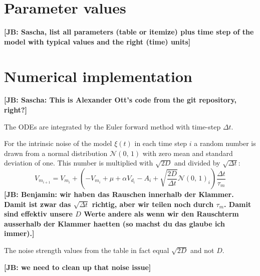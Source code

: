 \documentclass[12pt,a4paper]{article}
\newcommand{\note}[2][]{\textbf{[#1: #2]}}
\begin{document}
\section{Parameter values}

\note[JB]{Sascha, list all parameters (table or itemize) plus time step of the model with typical values and the right (time) units}


\section{Numerical implementation}

\note[JB]{Sascha: This is Alexander Ott's code from the git repository, right?}

The ODEs are integrated by the Euler forward method with time-step $\Delta t$.

For the intrinsic noise of the model $\xi(t)$ in each time step $i$ a random number is drawn from a normal distribution $\mathcal{N}(0,\,1)$ with zero mean and standard deviation of one. This number is multiplied with $\sqrt{2D}$ and divided by $\sqrt{\Delta t}$:
\begin{equation}
  \label{LIFintegration}
  V_{m_{i+1}}  = V_{m_i} + \left(-V_{m_i} + \mu + \alpha V_{d_i} - A_i + \sqrt{\frac{2D}{\Delta t}}\mathcal{N}(0,\,1)_i\right) \frac{\Delta t}{\tau_m}
\end{equation}
\note[JB]{Benjamin: wir haben das Rauschen innerhalb der Klammer. Damit ist zwar das $\sqrt{\Delta t}$ richtig, aber wir teilen noch durch $\tau_m$. Damit sind effektiv unsere $D$ Werte andere als wenn wir den Rauschterm ausserhalb der Klammer haetten (so machst du das glaube ich immer).}

The noise strength values from the table in fact equal $\sqrt{2D}$ and not $D$.

\note[JB]{we need to clean up that noise issue}
\end{document}
